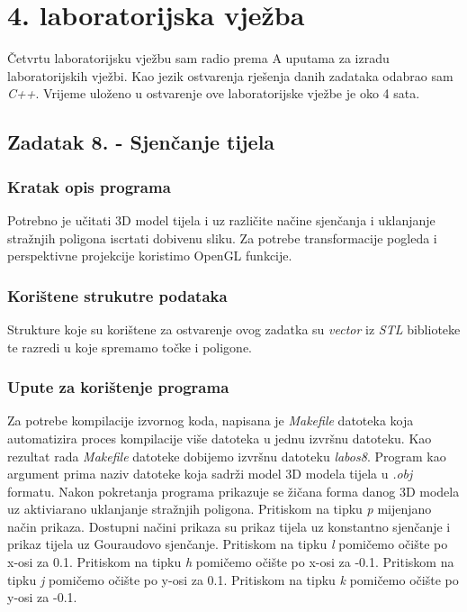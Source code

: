 \documentclass{report}
\begin{document}
\chapter{4. laboratorijska vježba}
Četvrtu laboratorijsku vježbu sam radio prema A uputama za izradu laboratorijskih vježbi. Kao jezik ostvarenja rješenja danih zadataka odabrao sam \textit{C++}. Vrijeme uloženo u ostvarenje ove laboratorijske vježbe je oko 4 sata. 

\section{Zadatak 8. - Sjenčanje tijela}
\subsection{Kratak opis programa}
Potrebno je učitati 3D model tijela i uz različite načine sjenčanja i uklanjanje stražnjih poligona iscrtati dobivenu sliku. Za potrebe transformacije pogleda i perspektivne projekcije koristimo OpenGL funkcije. 

\subsection{Korištene strukutre podataka}
Strukture koje su korištene za ostvarenje ovog zadatka su \textit{vector} iz \textit{STL} biblioteke te razredi u koje spremamo točke i poligone.

\subsection{Upute za korištenje programa}
Za potrebe kompilacije izvornog koda, napisana je \textit{Makefile} datoteka koja automatizira proces kompilacije više datoteka u jednu izvršnu datoteku. Kao rezultat rada \textit{Makefile} datoteke dobijemo izvršnu datoteku \textit{labos8}. Program kao argument prima naziv datoteke koja sadrži model 3D modela tijela u \textit{.obj} formatu. Nakon pokretanja programa prikazuje se žičana forma danog 3D modela uz aktiviarano uklanjanje stražnjih poligona. Pritiskom na tipku  \textit{p} mijenjano način prikaza. Dostupni načini prikaza su prikaz tijela uz konstantno sjenčanje i prikaz tijela uz Gouraudovo sjenčanje. Pritiskom na tipku \textit{l} pomičemo očište po x-osi za 0.1. Pritiskom na tipku \textit{h} pomičemo očište po x-osi za -0.1. Pritiskom na tipku \textit{j} pomičemo očište po y-osi za 0.1. Pritiskom na tipku \textit{k} pomičemo očište po y-osi za -0.1.
\end{document}
